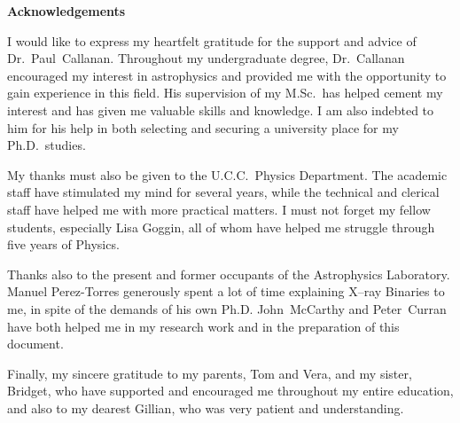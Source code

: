 
\begin{center}
\Large{\textbf{Acknowledgements}}
\end{center}

\vspace{\myparskip}

I would like to express my heartfelt gratitude for the support and
advice of Dr.~Paul~Callanan. Throughout my undergraduate degree,
Dr.~Callanan encouraged my interest in astrophysics and provided me
with the opportunity to gain experience in this field. His supervision
of my M.Sc.\ has helped cement my interest and has given me valuable
skills and knowledge. I am also indebted to him for his help in both
selecting and securing a university place for my Ph.D.\ studies. %

\vspace{\myparskip}

My thanks must also be given to the U.C.C.\ Physics Department. The
academic staff have stimulated my mind for several years, while the
technical and clerical staff have helped me with more practical
matters. I must not forget my fellow students, especially Lisa Goggin,
all of whom have helped me struggle through five years of Physics. %

\vspace{\myparskip}

Thanks also to the present and former occupants of the Astrophysics
Laboratory. Manuel Perez-Torres generously spent a lot of time
explaining X--ray Binaries to me, in spite of the demands of his own
Ph.D. John~McCarthy and Peter~Curran have both helped
me in my research work and in the preparation of this document. %

\vspace{\myparskip}

Finally, my sincere gratitude to my parents, Tom and Vera, and my
sister, Bridget, who have supported and encouraged me throughout my
entire education, and also to my dearest Gillian, who was very
patient and understanding. %
